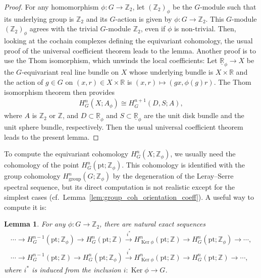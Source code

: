 \documentclass[11pt]{article}
\newtheorem{lem}[thm]{Lemma}
\theoremstyle{definition}
\newcommand{\R}{\mathbb{R}}
\newcommand{\Z}{\mathbb{Z}}
\newcommand{\pt}{\mathrm{pt}}
\begin{document}
\begin{proof}
For any homomorphism $\phi \colon G \to \Z_2$, let $(\Z_2)_\phi$ be the $G$-module such that its underlying group is $\Z_2$ and its $G$-action is given by $\phi \colon G \to \Z_2$. This $G$-module $(\Z_2)_\phi$ agrees with the trivial $G$-module $\Z_2$, even if $\phi$ is non-trivial. Then, looking at the cochain complexes def\/ining the equivariant cohomology, the usual proof of the universal coef\/f\/icient theorem leads to the lemma. Another proof is to use the Thom isomorphism, which unwinds the local coef\/f\/icients: Let $\underline{\R}_{\phi} \to X$ be the $G$-equivariant real line bundle on $X$ whose underlying bundle is $X \times \R$ and the action of $g \in G$ on $(x, r) \in X \times \R$ is $(x, r) \mapsto (gx, \phi(g)r)$. The Thom isomorphism theorem then provides
\begin{gather*}
H^n_G(X; A_\phi) \cong H^{n+1}_G(D, S; A),
\end{gather*}
where $A$ is $\Z_2$ or $\Z$, and $D \subset \underline{\R}_\phi$ and $S \subset \underline{\R}_\phi$ are the unit disk bundle and the unit sphere bundle, respectively. Then the usual universal coef\/f\/icient theorem leads to the present lemma.
\end{proof}

To compute the equivariant cohomology $H^n_G(X; \Z_\phi)$, we usually need the cohomology of the point $H^n_G(\pt; \Z_\phi)$. This cohomology is identif\/ied with the group cohomology $H^n_{\mathrm{group}}(G; \Z_\phi)$ by the degeneration of the Leray--Serre spectral sequence, but its direct computation is not realistic except for the simplest cases (cf.\ Lemma~\ref{lem:group_coh_orientation_coeff}). A useful way to compute it is:

\begin{lem} \label{lem:exact_seq}
For any $\phi \colon G \to \Z_2$, there are natural exact sequences
\begin{gather*}
\cdots \to H^{n-1}_G(\pt; \Z_\phi) \to H^n_G(\pt; \Z) \overset{i^*}{\to} H^n_{\operatorname{Ker}\phi}(\pt; \Z) \to H^n_G(\pt; \Z_\phi) \to \cdots, \\
\cdots \to H^{n-1}_G(\pt; \Z) \to H^n_G(\pt; \Z_\phi) \overset{i^*}{\to} H^n_{\operatorname{Ker}\phi}(\pt; \Z) \to H^n_G(\pt; \Z) \to \cdots,
\end{gather*}
where $i^*$ is induced from the inclusion $i \colon \operatorname{Ker}\phi \to G$.
\end{lem}
\end{document}
